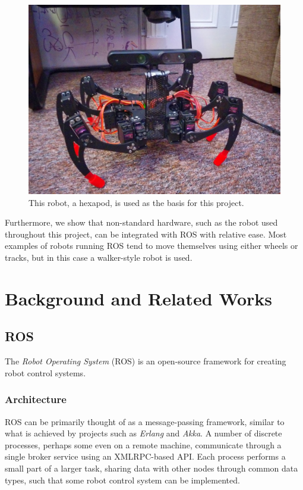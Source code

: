 \documentclass{l4proj}
\begin{document}
\begin{figure}[!h]
    \centering
    \includegraphics[width=12cm]{hexapod_body1}
    \caption{This robot, a hexapod, is used as the basis for this project.}
\end{figure}

Furthermore, we show that non-standard hardware, such as the robot used throughout this project, can be integrated with ROS with relative ease. Most examples of robots running ROS tend to move themselves using either wheels or tracks, but in this case a walker-style robot is used.


\chapter{Background and Related Works}

\section{ROS}

The \emph{Robot Operating System} (ROS) \cite{ros_site} is an open-source framework for creating robot control systems.

\subsection{Architecture}
ROS can be primarily thought of as a message-passing framework, similar to what is achieved by projects such as \emph{Erlang} \cite{erlang} and \emph{Akka}. A number of discrete processes, perhaps some even on a remote machine, communicate through a single broker service using an XMLRPC-based API. Each process performs a small part of a larger task, sharing data with other nodes through common data types, such that some robot control system can be implemented.
\end{document}
